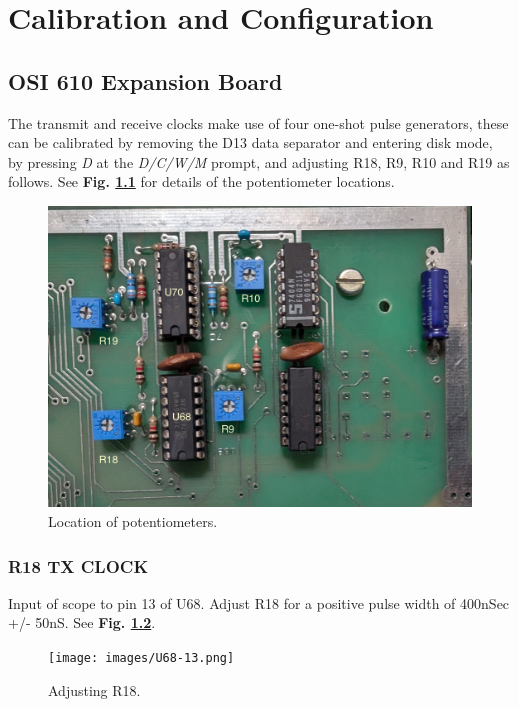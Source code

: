 \chapter{Calibration and Configuration}

\section{OSI 610 Expansion Board}

The transmit and receive clocks make use of four one-shot pulse generators, these can be calibrated by removing the D13 data separator and entering disk mode, by pressing \emph{D} at the \emph{D/C/W/M} prompt, and adjusting R18, R9, R10 and R19 as follows. See \textbf{Fig. \ref{fig:U68-70}} for details of the potentiometer locations.

\begin{figure}[htbp]
\begin{center}
\includegraphics[width=4.9in]{images/U68-70.jpg}
\caption{Location of potentiometers.}
\label{fig:U68-70}
\end{center}
\end{figure}

\subsection{R18 TX CLOCK}

Input of scope to pin 13 of U68. Adjust R18 for a positive pulse width of 400nSec +/- 50nS. See \textbf{Fig. \ref{fig:R18}}.


\begin{figure}[htbp]
\begin{center}
\texttt{[image: images/U68-13.png]}
\caption{Adjusting R18.}
\label{fig:R18}
\end{center}
\end{figure}

